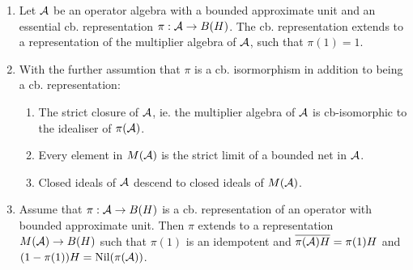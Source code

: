 \begin{theorem}\label{mesrennie114}
\begin{enumerate}
	\item Let $\mathcal{A}$ be an operator algebra with a bounded approximate unit and an essential cb. representation $\pi:\mathcal{A}\to B(H)$. The cb. representation extends to a representation of the multiplier algebra of $\mathcal{A}$, such that $\pi(1)=1$. 
	\item 
	With the further assumtion that $\pi$ is a cb. isormorphism in addition to being a cb. representation:
	\begin{enumerate}
		\item The strict closure of $\mathcal{A}$, ie. the multiplier algebra of $\mathcal{A}$ is cb-isomorphic to the idealiser of $\pi(\mathcal{A})$.
		\item Every element in $M(\mathcal{A})$ is the strict limit of a bounded net in $\mathcal{A}$.
		\item Closed ideals of $\mathcal{A}$ descend to closed ideals of $M(\mathcal{A})$.
	\end{enumerate}
	\item Assume that $\pi:\mathcal{A}\to B(H)$ is a cb. representation of an operator with bounded approximate unit. Then $\pi$ extends to a representation $M(\mathcal{A})\to B(H)$ such that $\pi(1)$ is an idempotent and $\overline{\pi(\mathcal{A})H}=\pi(1)H$ and $(1-\pi(1))H=\operatorname{Nil}(\pi(\mathcal{A}))$. 
	\end{enumerate}
\end{theorem}
